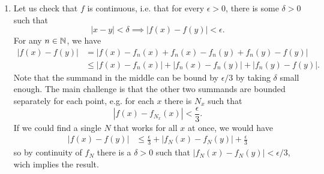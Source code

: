 \begin{example}
\begin{enumerate}
\begin{align*}
      f\cl [0,1] & \to \C
      \\
      x & \mapsto \lim_{n\to\infty}f_n(x),
      \end{align*}
      called the \emph{pointwise limit} of $f$.
      Note that, even if \(f(x)=\lim_{n\to\infty}f_n(x)\), this does
      \emph{not} automatically imply that $\lim_{n\to
      \infty}f_n=f$ (convergence with respect to the supremum norm), nor that
      $f\in C^0_\C[0,1]$, and hence we need to check separately that these
      do, in fact, hold.
    \item
      Let us check that $f$ is continuous, i.e.
      that for every \(\epsilon>0\), there is some \(\delta>0\) such that
      \begin{equation}
        |x-y|<\delta \implies |f(x)-f(y)|<\epsilon
      .\end{equation}
      For any \(n\in \mathbb{N}\), we have
      \begin{align*}
      |f(x)-f(y)|
      & = |f(x)-f_n(x)+f_n(x)-f_n(y)+f_n(y)-f(y)|
      \\
      & \leq |f(x)-f_n(x)|+|f_n(x)-f_n(y)|+|f_n(y)-f(y)|.
      \end{align*}
      Note that the summand in the middle can be bound by \(\epsilon /
      3\) by taking \(\delta\) small enough.
      The main challenge is that the other two summands are bounded
      separately for each point, e.g. for each \(x\) there is \(N_x\)
      such that
      \begin{equation}
        |f(x)-f_{N_x}(x)|<\frac{\epsilon}{3}
      .\end{equation}
      If we could find a single \(N\) that works for all \(x\) at
      once, we would have
      \begin{align*}
      |f(x)-f(y)|
      & \leq \frac{\epsilon}{3} + |f_N(x)-f_N(y)|+\frac{\epsilon}{3}
      \end{align*}
      so by continuity of \(f_N\) there is a \(\delta>0\) such that
      \(|f_N(x)-f_N(y)|<\epsilon / 3\), wich implies the result.


\end{enumerate}
\end{example}
